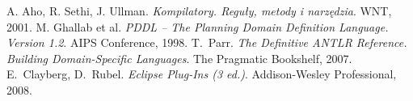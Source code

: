 
\begin{thebibliography}{1}


A. Aho, R. Sethi, J. Ullman. \emph{Kompilatory. Reguły, metody i narzędzia}.
WNT, 2001.
M. Ghallab et al. \emph{PDDL -- The Planning Domain Definition Language. Version 1.2}.
AIPS Conference, 1998.
T.~Parr. \emph{The Definitive ANTLR Reference. Building Domain-Specific Languages}. 
The Pragmatic Bookshelf, 2007.
E.~Clayberg, D.~Rubel. \emph{Eclipse Plug-Ins (3 ed.)}. Addison-Wesley Professional, 2008. 

\end{thebibliography}
